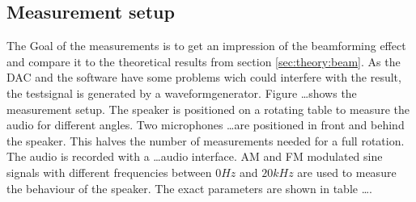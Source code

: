 \subsection{Measurement setup}

The Goal of the measurements is to get an impression of the beamforming effect and compare it to the theoretical results from section \ref{sec:theory:beam}. As the DAC and the software have some problems wich could interfere with the result, the testsignal is generated by a waveformgenerator. Figure \dots shows the measurement setup.\p
%
The speaker is positioned on a rotating table to measure the audio for different angles. Two microphones \dots are positioned in front and behind the speaker. This halves the number of measurements needed for a full rotation. The audio is recorded with a \dots audio interface.\p
%
AM and FM modulated sine signals with different frequencies between $0Hz$ and $20kHz$ are used to measure the behaviour of the speaker. The exact parameters are shown in table \dots.